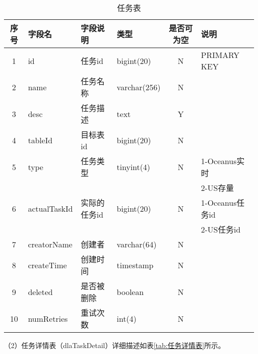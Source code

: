 \begin{table}[H]
  \centering
  \caption{任务表}
  \label{tab:任务表}
  \begin{tabular}{clllcl}
    \toprule
    序号  & 字段名         & 字段说明     & 类型           & 是否可为空   & 说明  \\
    \midrule
    1    & id            & 任务id      & bigint(20)     & N          & PRIMARY KEY    \\
    2    & name          & 任务名称     & varchar(256)   & N          &     \\
    3    & desc          & 任务描述     & text           & Y          &   \\
    4    & tableId       & 目标表id     & bigint(20)     & N          &   \\
    5    & type          & 任务类型     & tinyint(4)     & N          & 1-Oceanus实时  \\
         &               &             &               &             & 2-US存量  \\
    6    & actualTaskId  & 实际的任务id  & bigint(20)    & N          &  1-Oceanus任务id  \\
         &               &             &               &             & 2-US任务id  \\
    7    & creatorName   & 创建者       & varchar(64)    & N          &   \\
    8    & createTime    & 创建时间     & timestamp      & N          &   \\
    9    & deleted       & 是否被删除    & boolean        & N          &   \\
    10   & numRetries    & 重试次数      & int(4)        & N          &   \\
    \bottomrule
  \end{tabular}
\end{table}

（2）任务详情表（dlaTaskDetail）详细描述如表\ref{tab:任务详情表}所示。

